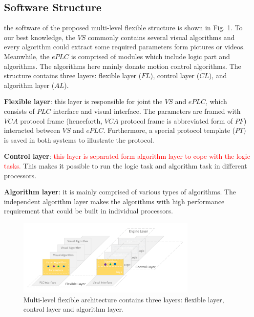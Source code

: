 \documentclass[journal,UTF8]{IEEEtran}
\begin{document}
\subsection{Software Structure}
the software of the proposed multi-level flexible structure is shown in Fig. \ref{fig:Software}. To our best knowledge, the $VS$ commonly contains several visual algorithms and every algorithm could extract some required parameters form pictures or videos. Meanwhile, the $ePLC$ is comprised of modules which include logic part and algorithms. The algorithms here mainly donate motion control algorithms. The structure contains three layers: flexible layer ($FL$), control layer ($CL$), and algorithm layer ($AL$).

\textbf{Flexible layer}: this layer is responsible for joint the $VS$ and $ePLC$, which consists of $PLC$ interface and visual interface. The parameters are framed with $VCA$ protocol frame (henceforth, $VCA$ protocol frame is abbreviated form of $PF$) interacted between $VS$ and $ePLC$. Furthermore, a special protocol template ($PT$) is saved in both systems to illustrate the protocol.

\textbf{Control layer}: \textcolor{red}{this layer is separated form algorithm layer to cope with the logic tasks.} This makes it possible to run the logic task and algorithm task in different processors.

\textbf{Algorithm layer}: it is mainly comprised of various types of algorithms. The independent algorithm layer makes the algorithms with high performance requirement that could be built in individual processors. 


\begin{figure}
	\centering
	\includegraphics[width=3.5in]{fig/Software.pdf}
	\caption{Multi-level flexible architecture contains three layers: flexible layer, control layer and algorithm layer.}
	\label{fig:Software}
\end{figure}
\end{document}
